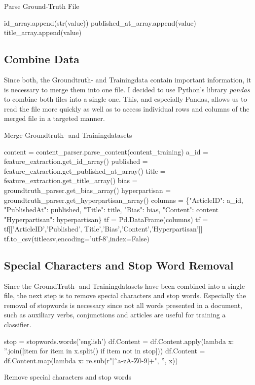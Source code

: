 \documentclass[a4paper, 11pt,titlepage,oneside,openany]{book}
\begin{document}
\begin{algorithm}[H]
	\DontPrintSemicolon
	\caption{Parse Ground-Truth File}
	{
		{
			{id\_array.append(str(value))}
			{published\_at\_array.append(value)}
			{title\_array.append(value)}
		}
	}
\end{algorithm}
\newpage 
\subsection{Combine Data}
Since both, the Groundtruth- and Trainingdata contain important information, it is necessary to merge them into one file. I decided to use Python's library \textit{pandas} \cite{pandas} to combine both files into a single one. This, and especially Pandas, allows us to read the file more quickly as well as to access individual rows and columns of the merged file in a targeted manner.\\

\begin{algorithm}[H]
	\DontPrintSemicolon
	\caption{Merge Groundtruth- and Trainingdatasets}
	content = content\_parser.parse\_content(content\_training)\;
	a\_id = feature\_extraction.get\_id\_array()\;
	\BlankLine
	\BlankLine
	published = feature\_extraction.get\_published\_at\_array()\;
	title = feature\_extraction.get\_title\_array()\;
	bias = groundtruth\_parser.get\_bias\_array()\;
	hyperpartisan = groundtruth\_parser.get\_hyperpartisan\_array()\;
	\BlankLine
	columns = \{"ArticleID": a\_id, "PublishedAt": published, "Title": title, "Bias": bias, "Content": content  "Hyperpartisan": hyperpartisan\}\;
	\BlankLine
	\BlankLine
	tf = Pd.DataFrame(columns)\;
	tf = tf[['ArticleID','Published', Title','Bias','Content','Hyperpartisan']]\;
	tf.to\_csv(titlecsv,encoding='utf-8',index=False)\;
\end{algorithm}

\subsection{Special Characters and Stop Word Removal}
Since the GroundTruth- and Trainingdatasets have been combined into a single file, the next step  is to remove special characters and stop words. Especially the removal of stopwords is necessary since not all words presented in a document, such as auxiliary verbs, conjunctions and articles \cite{textclassification} are useful for training a classifier.\\
\begin{algorithm}[H]
	\DontPrintSemicolon
	stop = stopwords.words('english')\;
	\BlankLine
	\BlankLine
	df.Content = df.Content.apply(lambda x: ''.join([item for item in x.split() if item not in stop]))\;
	df.Content = df.Content.map(lambda x: re.sub(r"[\^\ a-zA-Z0-9]+", '', x))\;
	\caption{Remove special characters and stop words}
\end{algorithm}
\end{document}
